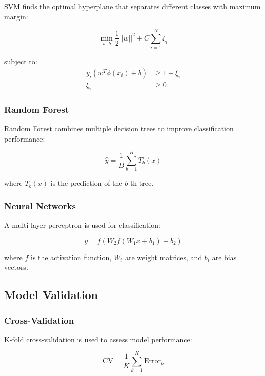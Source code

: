 SVM finds the optimal hyperplane that separates different classes with maximum margin:

\begin{equation}
\min_{w,b} \frac{1}{2}||w||^2 + C \sum_{i=1}^{N} \xi_i
\end{equation}

subject to:
\begin{align}
y_i(w^T \phi(x_i) + b) &\geq 1 - \xi_i \\
\xi_i &\geq 0
\end{align}

\subsubsection{Random Forest}

Random Forest combines multiple decision trees to improve classification performance:

\begin{equation}
\hat{y} = \frac{1}{B} \sum_{b=1}^{B} T_b(x)
\end{equation}

where $T_b(x)$ is the prediction of the $b$-th tree.

\subsubsection{Neural Networks}

A multi-layer perceptron is used for classification:

\begin{equation}
y = f(W_2 f(W_1 x + b_1) + b_2)
\end{equation}

where $f$ is the activation function, $W_i$ are weight matrices, and $b_i$ are bias vectors.

\subsection{Model Validation}

\subsubsection{Cross-Validation}

K-fold cross-validation is used to assess model performance:

\begin{equation}
\text{CV} = \frac{1}{K} \sum_{k=1}^{K} \text{Error}_k
\end{equation}


